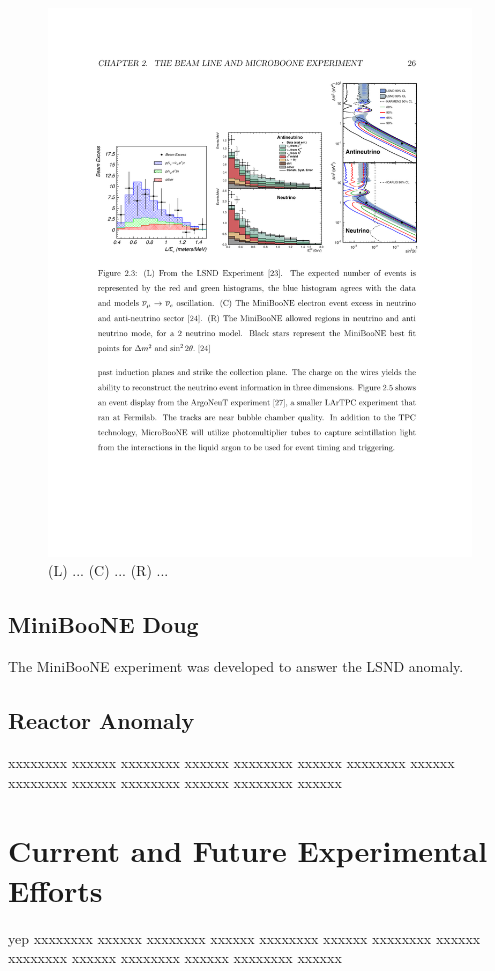 \documentclass[aps,prd,twocolumn,nofootinbib]{revtex4-1}
\begin{document}
\begin{figure}
  \includegraphics[width=1\textwidth]{../figures/lsnd_miniboone.pdf}
  \caption{(L) ... (C) ... (R) ...}
  \label{fig:lsnd_miniboone}
\end{figure}
\subsection{MiniBooNE Doug}
The MiniBooNE experiment was developed to answer the LSND anomaly.
\subsection{Reactor Anomaly}
xxxxxxxx xxxxxx xxxxxxxx xxxxxx xxxxxxxx xxxxxx xxxxxxxx xxxxxx xxxxxxxx xxxxxx xxxxxxxx xxxxxx xxxxxxxx xxxxxx
\section{Current and Future Experimental Efforts}
yep
xxxxxxxx xxxxxx xxxxxxxx xxxxxx xxxxxxxx xxxxxx xxxxxxxx xxxxxx xxxxxxxx xxxxxx xxxxxxxx xxxxxx xxxxxxxx xxxxxx
\end{document}
